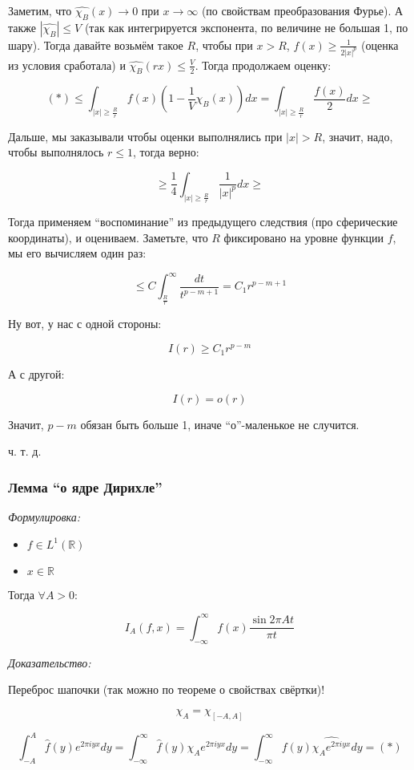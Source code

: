 \documentclass{article}
\begin{document}
Заметим, что $\widehat{\chi_B}(x) \rightarrow 0$ при $x \rightarrow \infty$ (по свойствам преобразования Фурье). А также $|\widehat{\chi_B}| \le V$ (так как интегрируется экспонента, по величине не большая 1, по шару). Тогда давайте возьмём такое $R$, чтобы при $x > R$, $f(x) \ge \frac{1}{2|x|^p}$ (оценка из условия сработала) и $\widehat{\chi_B}(rx) \le \frac{V}{2}$. Тогда продолжаем оценку:

\[(*) \le \int_{|x| \ge \frac{R}{r}} f(x)\left(1 - \frac{1}{V}\widehat{\chi_B}(x)\right)dx = \int_{|x| \ge \frac{R}{r}} \frac{f(x)}{2}dx \ge \]

Дальше, мы заказывали чтобы оценки выполнялись при $|x| > R$, значит, надо, чтобы выполнялось $r \le 1$, тогда верно:

\[\ge \frac{1}{4} \int_{|x| \ge \frac{R}{r}} \frac{1}{|x|^p} dx \ge \]

Тогда применяем ``воспоминание'' из предыдущего следствия (про сферические координаты), и оцениваем. Заметьте, что $R$ фиксировано на уровне функции $f$, мы его вычисляем один раз:

\[\le C \int_{\frac{R}{r}}^{\infty} \frac{dt}{t^{p - m + 1}} = C_1 r^{ p - m + 1}\]

Ну вот, у нас с одной стороны:

\[I(r) \ge C_1 r^{p - m}\]

А с другой:

\[I(r) = o(r)\]

Значит, $p - m$ обязан быть больше 1, иначе ``о''-маленькое не случится.

ч. т. д. 
\subsubsection{Лемма ``о ядре Дирихле''}
\textit{Формулировка:}

\begin{itemize}
    \item $f \in L^1(\mathbb{R})$
    \item $x \in \mathbb{R}$
\end{itemize}

Тогда $\forall A > 0$:

\[I_A(f, x) = \int_{-\infty}^{\infty}f(x)\frac{\sin 2\pi A t}{\pi t}\]

\textit{Доказательство:}

Переброс шапочки (так можно по теореме о свойствах свёртки)!

\[\chi_A = \chi_{[-A, A]}\]

\[\int_{-A}^{A} \hat{f}(y)e^{2\pi i y x}dy = \int_{-\infty}^{\infty} \hat{f}(y)\chi_Ae^{2\pi i y x}dy = \int_{-\infty}^{\infty} f(y)\widehat{\chi_Ae^{2\pi i y x}}dy = (*)\]
\end{document}
